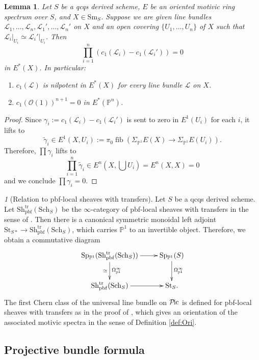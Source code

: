 \documentclass{amsart}
\theoremstyle{plain}
\newtheorem{lemma}[theorem]{Lemma}
\theoremstyle{definition}
\theoremstyle{remark}
\newtheorem{p}[theorem]{}
\numberwithin{equation}{theorem}
\newcommand{\mcal}[1]{\mathcal{#1}}
\newcommand{\mbb}[1]{\mathbb{#1}}
\newcommand{\mrm}[1]{\mathrm{#1}}
\newcommand{\Sch}{\mathrm{Sch}}
\newcommand{\Sh}{\mathrm{Sh}}
\newcommand{\Sm}{\mathrm{Sm}}
\newcommand{\St}{\mathrm{St}}
\newcommand{\pbf}{\mathrm{pbf}}
\newcommand{\OmegaP}{\Omega_{\mathbb{P}^1}}
\newcommand{\SigmaP}{\Sigma_{\mathbb{P}^1}}
\newcommand{\SpP}{\mathrm{Sp}_{\mathbb{P}^1}}
\newcommand{\Pic}{{\mathcal{P}\mspace{-2.0mu}\mathrm{ic}}}
\newcommand{\fib}{\operatorname{fib}}
\begin{document}
\begin{lemma}\label{lem:Ori3}
Let $S$ be a qcqs derived scheme, $E$ be an oriented motivic ring spectrum over $S$, and $X\in\Sm_S$.
Suppose we are given line bundles $\mcal{L}_1,\dotsc,\mcal{L}_n,\mcal{L}_1',\dotsc,\mcal{L}_n'$ on $X$ and an open covering $\{U_1,\dotsc,U_n\}$ of $X$ such that $\mcal{L}_i\vert_{U_i}\simeq\mcal{L}_i'\vert_{U_i}$.
Then
\[
	\prod_{i=1}^n(c_1(\mcal{L}_i)-c_1(\mcal{L}_i'))=0
\]
in $E^*(X)$.
In particular:
\begin{enumerate}[label=\upshape{(\roman*)}]
\item $c_1(\mcal{L})$ is nilpotent in $E^*(X)$ for every line bundle $\mcal{L}$ on $X$.
\item $c_1(\mcal{O}(1))^{n+1}=0$ in $E^*(\mbb{P}^n)$.
\end{enumerate}
\end{lemma}
\begin{proof}
Since $\gamma_i:=c_1(\mcal{L}_i)-c_1(\mcal{L}_i')$ is sent to zero in $E^1(U_i)$ for each $i$, it lifts to
\[
	\tilde{\gamma}_i \in E^1(X,U_i) := \pi_0\fib(\SigmaP E(X)\to \SigmaP E(U_i)).
\]
Therefore, $\prod\gamma_i$ lifts to
\[
	\prod_{i=1}^n\tilde{\gamma}_i \in E^n(X,\bigcup U_i) = E^n(X,X) = 0
\]
and we conclude $\prod\gamma_i=0$.
\end{proof}

\begin{p}[Relation to pbf-local sheaves with transfers]
Let $S$ be a qcqs derived scheme.
Let $\Sh^\mrm{tr}_\pbf(\Sch_S)$ be the $\infty$-category of pbf-local sheaves with transfers in the sense of \cite{AI}.
Then there is a canonical symmetric monoidal left adjoint $\St_{S*}\to\Sh^\mrm{tr}_\pbf(\Sch_S)$, which carries $\mbb{P}^1$ to an invertible object.
Therefore, we obtain a commutative diagram
\[
\xymatrix{
	\SpP(\Sh^\mrm{tr}_\pbf(\Sch_S)) \ar[r] \ar[d]^{\OmegaP^\infty}_\simeq & \SpP(S) \ar[d]^{\OmegaP^\infty} \\
	\Sh^\mrm{tr}_\pbf(\Sch_S) \ar[r] & \St_S.
}
\]
The first Chern class of the universal line bundle on $\Pic$ is defined for pbf-local sheaves with transfers as in the proof of \cite[Lemma 3.2]{AI}, which gives an orientation of the associated motivic spectra in the sense of Definition \ref{def:Ori}.
\end{p}


\subsection{Projective bundle formula}\label{PBF}
\end{document}
